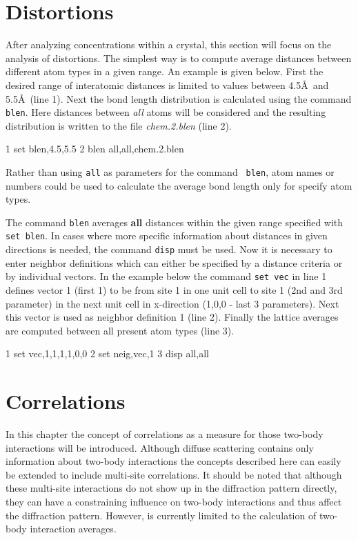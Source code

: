\section{Distortions \label{chem-dist}}

After analyzing concentrations within a crystal, this section will
focus on the analysis of distortions. The simplest way is to compute
average distances between different atom types in a given range. An
example is given below. First the desired range of interatomic
distances is limited to values between 4.5\AA \ and 5.5\AA \ (line
1). Next the bond length distribution is calculated using the 
\Discus command {\tt blen}. Here distances between {\it all} atoms
will be considered and the resulting distribution is written to the
file {\it chem.2.blen} (line 2).
%

\begin{MacVerbatim}
     1  set blen,4.5,5.5
     2  blen all,all,chem.2.blen
\end{MacVerbatim}
%
Rather than using {\tt all} as parameters for the command {\tt
blen}, atom names or numbers could be used to calculate the average
bond length only for specify atom types.
\par

The command {\tt blen} averages {\bf all} distances within the given
range specified with {\tt set blen}. In cases where more specific
information about distances in given directions is needed, the
command {\tt disp} must be used. Now it is necessary to enter
neighbor definitions which can either be specified by a distance
criteria or by individual vectors. In the example below the command
{\tt set vec} in line 1 defines vector 1 (first 1) to be from site 1
in one unit cell to site 1 (2nd and 3rd parameter) in the next unit
cell in x-direction (1,0,0 - last 3 parameters). Next this vector is
used as neighbor definition 1 (line 2). Finally the lattice
averages are computed between all present atom types (line 3).
%
\begin{MacVerbatim}
     1  set vec,1,1,1,1,0,0
     2  set neig,vec,1
     3  disp all,all
\end{MacVerbatim}


\section{Correlations \label{chem-corr}}

In this chapter the concept of correlations as a measure for those
two-body interactions will be introduced. Although diffuse
scattering contains only information about two-body interactions the
concepts described here can easily be extended to include multi-site
correlations. It should be noted that although these multi-site
interactions do not show up in the diffraction pattern directly,
they can have a constraining influence on two-body interactions and
thus affect the diffraction pattern. However, \Discus is
currently limited to the calculation of two-body interaction
averages. \par

